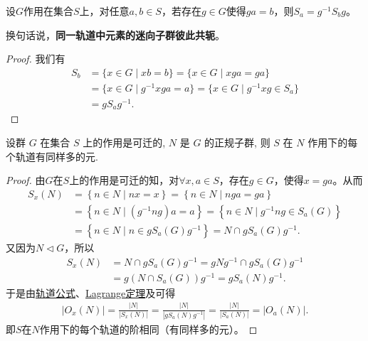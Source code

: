 \documentclass[../../main.tex]{subfiles}%
\begin{document}
\begin{proposition}
设$G$作用在集合$S$上，对任意$a,b\in S$，若存在$g\in G$使得$ga=b$，则$S_a=g^{-1}S_bg$。
\end{proposition}
\begin{remark}
换句话说，\textbf{同一轨道中元素的迷向子群彼此共轭}。
\end{remark}
\begin{proof}

我们有
\begin{align*}
S_b &= \{x\in G \mid xb = b\} = \{x\in G \mid xga = ga\} \\
&= \{x\in G \mid g^{-1}xga = a\} = \{x\in G \mid g^{-1}xg \in S_a\} \\
&= gS_ag^{-1}.
\end{align*}

\end{proof}

\begin{example}
设群 $G$ 在集合 $S$ 上的作用是可迁的, $N$ 是 $G$ 的正规子群, 则 $S$ 在 $N$ 作用下的每个轨道有同样多的元.
\end{example}
\begin{proof}

由$G$在$S$上的作用是可迁的知，对$\forall x,a\in S$，存在$g\in G$，使得$x=ga$。从而
\begin{align*}
S_x\left( N \right) &=\left\{ n\in N\mid nx=x \right\} =\left\{ n\in N\mid nga=ga \right\} \\
&=\left\{ n\in N\mid \left( g^{-1}ng \right) a=a \right\} =\left\{ n\in N\mid g^{-1}ng\in S_a\left( G \right) \right\} \\
&=\left\{ n\in N\mid n\in gS_a\left( G \right) g^{-1} \right\} =N\cap gS_a\left( G \right) g^{-1}.
\end{align*}
又因为$N\lhd G$，所以
\begin{align*}
S_x\left( N \right) &=N\cap gS_a\left( G \right) g^{-1}=gNg^{-1}\cap gS_a\left( G \right) g^{-1}\\
&=g\left( N\cap S_a\left( G \right) \right) g^{-1}=gS_a\left( N \right) g^{-1}.
\end{align*}
于是由\hyperref[corollary:有限群轨道的阶与其商掉迷向子群的阶相同]{轨道公式}、\hyperref[theorem:抽象代数--Lagrange定理]{Lagrange定理}及可得
\begin{align*}
\left| O_x\left( N \right) \right|=\frac{\left| N \right|}{\left| S_x\left( N \right) \right|}=\frac{\left| N \right|}{\left| gS_a\left( N \right) g^{-1} \right|}=\frac{\left| N \right|}{\left| S_a\left( N \right) \right|}=\left| O_a\left( N \right) \right|.
\end{align*}
即$S$在$N$作用下的每个轨道的阶相同（有同样多的元）。

\end{proof}
\end{document}
